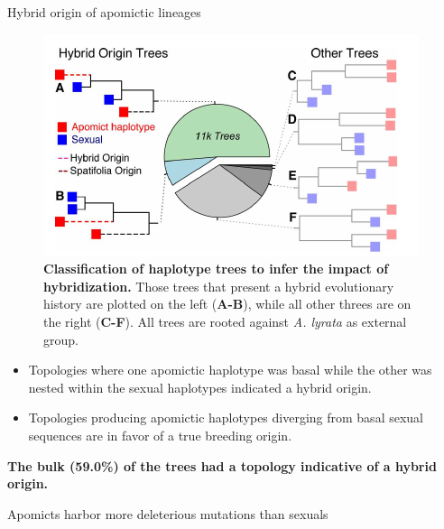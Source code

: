 \documentclass[final,20pt]{beamer}
\newlength{\colwidth}
\begin{document}
\begin{frame}[t]
\begin{columns}[t]
\begin{column}{\colwidth}
\begin{block}{Hybrid origin of apomictic lineages}
    \begin{figure}
      \begin{minipage}[c]{0.67\textwidth}
        \includegraphics[width=\textwidth]{./fig3.png}
      \end{minipage}\hfill
      \begin{minipage}[c]{0.3\textwidth}
      \caption{\textbf{Classification of haplotype trees to infer the impact of hybridization.} 
      Those trees that present a hybrid evolutionary history are plotted on the left (\textbf{A-B}), 
      while all other threes are on the right (\textbf{C-F}).
      All trees are rooted against \textit{A. lyrata} as external group.
      }
      \end{minipage}
    \end{figure}
    \begin{itemize}
      \item Topologies where one apomictic haplotype was
      basal while the other was nested within the sexual haplotypes indicated a
      hybrid origin. 
      \item Topologies producing apomictic haplotypes diverging from basal sexual 
      sequences are in favor of a true breeding origin.
    \end{itemize} 
    \textbf{The bulk (59.0\%) of the trees had a topology indicative of a hybrid origin. }



  \end{block}

  \begin{alertblock}{Apomicts harbor more deleterious mutations than sexuals}


\end{alertblock}
\end{column}
\end{columns}
\end{frame}
\end{document}
